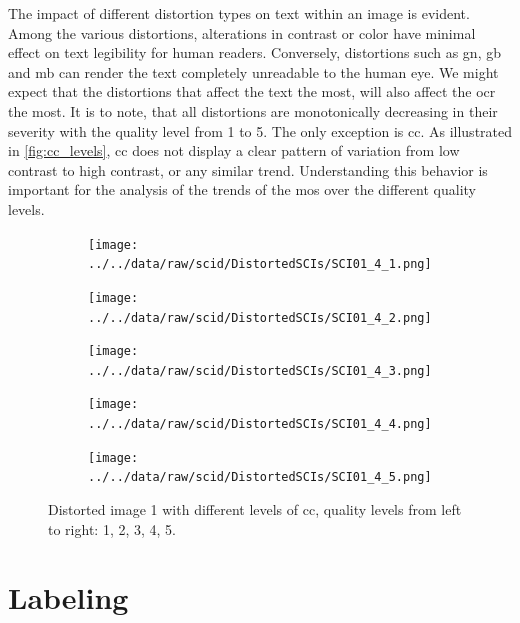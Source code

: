 The impact of different distortion types on text within an image is evident.
Among the various distortions, alterations in contrast or color have minimal effect on text legibility for human readers.
Conversely, distortions such as \gls{gn}, \gls{gb} and \gls{mb} can render the text completely unreadable to the human eye.
We might expect that the distortions that affect the text the most, will also affect the \gls{ocr} the most.
It is to note, that all distortions are monotonically decreasing in their severity with the quality level from 1 to 5.
The only exception is \gls{cc}.
As illustrated in \autoref{fig:cc_levels}, \gls{cc} does not display a clear pattern of variation from low contrast to high contrast, or any similar trend.
Understanding this behavior is important for the analysis of the trends of the \gls{mos} over the different quality levels.

\begin{figure}
    \centering
    \begin{subfigure}[b]{0.18\textwidth}
        \texttt{[image: ../../data/raw/scid/DistortedSCIs/SCI01\_4\_1.png]}
    \end{subfigure}
    \hfill
    \begin{subfigure}[b]{0.18\textwidth}
        \texttt{[image: ../../data/raw/scid/DistortedSCIs/SCI01\_4\_2.png]}
    \end{subfigure}
    \hfill
    \begin{subfigure}[b]{0.18\textwidth}
        \texttt{[image: ../../data/raw/scid/DistortedSCIs/SCI01\_4\_3.png]}
    \end{subfigure}
    \hfill
    \begin{subfigure}[b]{0.18\textwidth}
        \texttt{[image: ../../data/raw/scid/DistortedSCIs/SCI01\_4\_4.png]}
    \end{subfigure}
    \hfill
    \begin{subfigure}[b]{0.18\textwidth}
        \texttt{[image: ../../data/raw/scid/DistortedSCIs/SCI01\_4\_5.png]}
    \end{subfigure}
    \caption{Distorted image 1 with different levels of \gls{cc}, quality levels from left to right: 1, 2, 3, 4, 5.}
    \label{fig:cc_levels}
\end{figure}

\section{Labeling}
\label{sec:dataset_labeling}

